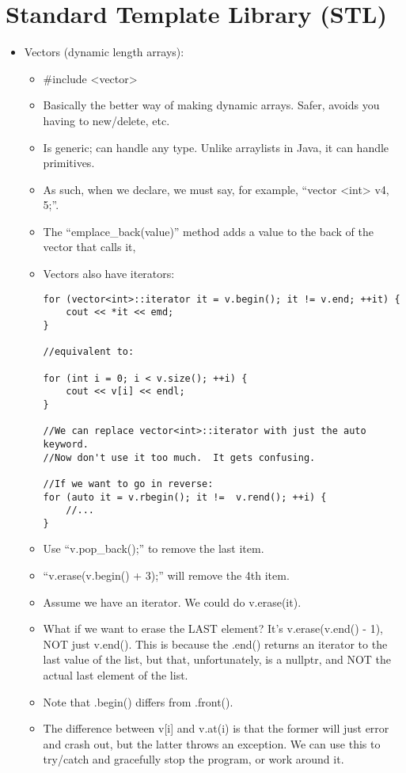 \documentclass{article}
\begin{document}
\section {Standard Template Library (STL)}
\begin{itemize}
\item Vectors (dynamic length arrays):
\begin{itemize}
\item #include <vector>
\item Basically the better way of making dynamic arrays.  Safer, avoids you having to new/delete, etc.
\item Is generic; can handle any type.  Unlike arraylists in Java, it can handle primitives.
\item As such, when we declare, we must say, for example, ``vector <int> v{4, 5};''.
\item The ``emplace\_back(value)'' method adds a value to the back of the vector that calls it,
\item Vectors also have iterators:
\begin{lstlisting}
for (vector<int>::iterator it = v.begin(); it != v.end; ++it) {
    cout << *it << emd;
}

//equivalent to:

for (int i = 0; i < v.size(); ++i) {
    cout << v[i] << endl;
}

//We can replace vector<int>::iterator with just the auto keyword.
//Now don't use it too much.  It gets confusing.

//If we want to go in reverse:
for (auto it = v.rbegin(); it !=  v.rend(); ++i) {
    //...
}
\end{lstlisting}
\item Use ``v.pop\_back();'' to remove the last item.
\item ``v.erase(v.begin() + 3);'' will remove the 4th item.
\item Assume we have an iterator. We could do v.erase(it).
\item What if we want to erase the LAST element?  It's v.erase(v.end() - 1), NOT just v.end().  This is because the .end() returns an iterator to the last value of the list, but that, unfortunately, is a nullptr, and NOT the actual last element of the list.
\item Note that .begin() differs from .front(). 
\item The difference between v[i] and v.at(i) is that the former will just error and crash out, but the latter throws an exception.  We can use this to try/catch and gracefully stop the program, or work around it.
\end{itemize}


\end{itemize}
\end{document}
